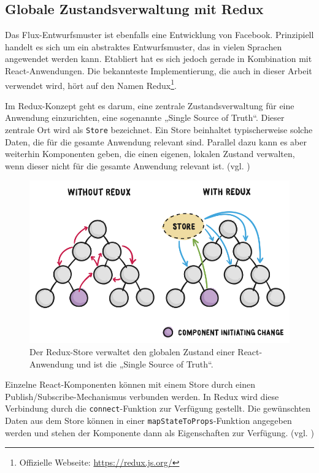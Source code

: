 \subsection{Globale Zustandsverwaltung mit Redux}
\label{chap:redux_state_management}
Das Flux-Entwurfsmuster ist ebenfalls eine Entwicklung von Facebook. Prinzipiell handelt es sich um ein abstraktes Entwurfsmuster, das in vielen Sprachen angewendet werden kann. Etabliert hat es sich jedoch gerade in Kombination mit React-Anwendungen. Die bekannteste Implementierung, die auch in dieser Arbeit verwendet wird, hört auf den Namen Redux\footnote{Offizielle Webseite: \url{https://redux.js.org/}}.

Im Redux-Konzept geht es darum, eine zentrale Zustandsverwaltung für eine Anwendung einzurichten, eine sogenannte „Single Source of Truth“. Dieser zentrale Ort wird als \texttt{Store} bezeichnet. Ein Store beinhaltet typischerweise solche Daten, die für die gesamte Anwendung relevant sind. Parallel dazu kann es aber weiterhin Komponenten geben, die einen eigenen, lokalen Zustand verwalten, wenn dieser nicht für die gesamte Anwendung relevant ist. (vgl. \cite{web:redux_motivation})

\begin{figure}[H]
    \includegraphics[width=12cm]{chapter/entwurf/bilder/BA_redux.png}
    \centering
    \caption[Redux Dataflow]{Der Redux-Store verwaltet den globalen Zustand einer React-Anwendung und ist die „Single Source of Truth“.\protect\footnotemark}

    \label{abb:redux_store}
\end{figure}



Einzelne React-Komponenten können mit einem Store durch einen Publish/Subscribe-Mechanismus verbunden werden. In Redux wird diese Verbindung durch die \texttt{connect}-Funktion zur Verfügung gestellt. Die gewünschten Daten aus dem Store können in einer \texttt{mapStateToProps}-Funktion angegeben werden und stehen der Komponente dann als Eigenschaften zur Verfügung. (vgl. \cite[Abschnitt „Implementing Container Components“]{web:redux_react})

